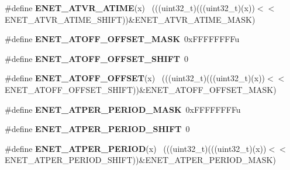 \begin{DoxyCompactItemize}
\item 
\hypertarget{group___e_n_e_t___register___masks_ga89aeda57d8476570d88b75a3021c384b}{}\#define {\bfseries E\+N\+E\+T\+\_\+\+A\+T\+V\+R\+\_\+\+A\+T\+I\+M\+E}(x)                                          ~(((uint32\+\_\+t)(((uint32\+\_\+t)(x))$<$$<$E\+N\+E\+T\+\_\+\+A\+T\+V\+R\+\_\+\+A\+T\+I\+M\+E\+\_\+\+S\+H\+I\+F\+T))\&E\+N\+E\+T\+\_\+\+A\+T\+V\+R\+\_\+\+A\+T\+I\+M\+E\+\_\+\+M\+A\+S\+K)\label{group___e_n_e_t___register___masks_ga89aeda57d8476570d88b75a3021c384b}

\item 
\hypertarget{group___e_n_e_t___register___masks_ga71beb7d6b82e503c872b4ca86033742d}{}\#define {\bfseries E\+N\+E\+T\+\_\+\+A\+T\+O\+F\+F\+\_\+\+O\+F\+F\+S\+E\+T\+\_\+\+M\+A\+S\+K}~0x\+F\+F\+F\+F\+F\+F\+F\+Fu\label{group___e_n_e_t___register___masks_ga71beb7d6b82e503c872b4ca86033742d}

\item 
\hypertarget{group___e_n_e_t___register___masks_ga6ee3bf7413489ccf980bb573591e692e}{}\#define {\bfseries E\+N\+E\+T\+\_\+\+A\+T\+O\+F\+F\+\_\+\+O\+F\+F\+S\+E\+T\+\_\+\+S\+H\+I\+F\+T}~0\label{group___e_n_e_t___register___masks_ga6ee3bf7413489ccf980bb573591e692e}

\item 
\hypertarget{group___e_n_e_t___register___masks_ga652c51cdcb24310e5e33756fc6f7026b}{}\#define {\bfseries E\+N\+E\+T\+\_\+\+A\+T\+O\+F\+F\+\_\+\+O\+F\+F\+S\+E\+T}(x)                                      ~(((uint32\+\_\+t)(((uint32\+\_\+t)(x))$<$$<$E\+N\+E\+T\+\_\+\+A\+T\+O\+F\+F\+\_\+\+O\+F\+F\+S\+E\+T\+\_\+\+S\+H\+I\+F\+T))\&E\+N\+E\+T\+\_\+\+A\+T\+O\+F\+F\+\_\+\+O\+F\+F\+S\+E\+T\+\_\+\+M\+A\+S\+K)\label{group___e_n_e_t___register___masks_ga652c51cdcb24310e5e33756fc6f7026b}

\item 
\hypertarget{group___e_n_e_t___register___masks_ga86f89e80c9b16d19744517af3d775f57}{}\#define {\bfseries E\+N\+E\+T\+\_\+\+A\+T\+P\+E\+R\+\_\+\+P\+E\+R\+I\+O\+D\+\_\+\+M\+A\+S\+K}~0x\+F\+F\+F\+F\+F\+F\+F\+Fu\label{group___e_n_e_t___register___masks_ga86f89e80c9b16d19744517af3d775f57}

\item 
\hypertarget{group___e_n_e_t___register___masks_gadef7d222ae0f44afa4379b3a27e89978}{}\#define {\bfseries E\+N\+E\+T\+\_\+\+A\+T\+P\+E\+R\+\_\+\+P\+E\+R\+I\+O\+D\+\_\+\+S\+H\+I\+F\+T}~0\label{group___e_n_e_t___register___masks_gadef7d222ae0f44afa4379b3a27e89978}

\item 
\hypertarget{group___e_n_e_t___register___masks_ga333e467283e34b1192852fbd1eea3b52}{}\#define {\bfseries E\+N\+E\+T\+\_\+\+A\+T\+P\+E\+R\+\_\+\+P\+E\+R\+I\+O\+D}(x)                                      ~(((uint32\+\_\+t)(((uint32\+\_\+t)(x))$<$$<$E\+N\+E\+T\+\_\+\+A\+T\+P\+E\+R\+\_\+\+P\+E\+R\+I\+O\+D\+\_\+\+S\+H\+I\+F\+T))\&E\+N\+E\+T\+\_\+\+A\+T\+P\+E\+R\+\_\+\+P\+E\+R\+I\+O\+D\+\_\+\+M\+A\+S\+K)\label{group___e_n_e_t___register___masks_ga333e467283e34b1192852fbd1eea3b52}


\end{DoxyCompactItemize}
